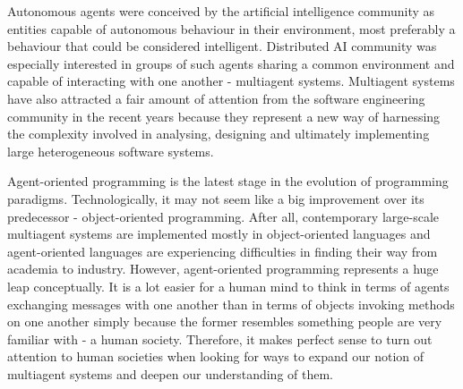 


Autonomous agents were conceived by the artificial intelligence community as entities capable of autonomous behaviour in their environment, most preferably a behaviour that could be considered intelligent.
Distributed AI community was especially interested in groups of such agents sharing a common environment and capable of interacting with one another - multiagent systems.
Multiagent systems have also attracted a fair amount of attention from the software engineering community in the recent years because they represent a new way of harnessing the complexity involved in analysing, designing and ultimately implementing large heterogeneous software systems.
 
Agent-oriented programming is the latest stage in the evolution of programming paradigms.
Technologically, it may not seem like a big improvement over its predecessor - object-oriented programming.
After all, contemporary large-scale multiagent systems are implemented mostly in object-oriented languages and agent-oriented languages are experiencing difficulties in finding their way from academia to industry.
However, agent-oriented programming represents a huge leap conceptually.
It is a lot easier for a human mind to think in terms of agents exchanging messages with one another than in terms of objects invoking methods on one another simply because the former resembles something people are very familiar with - a human society.
Therefore, it makes perfect sense to turn out attention to human societies when looking for ways to expand our notion of multiagent systems and deepen our understanding of them.

